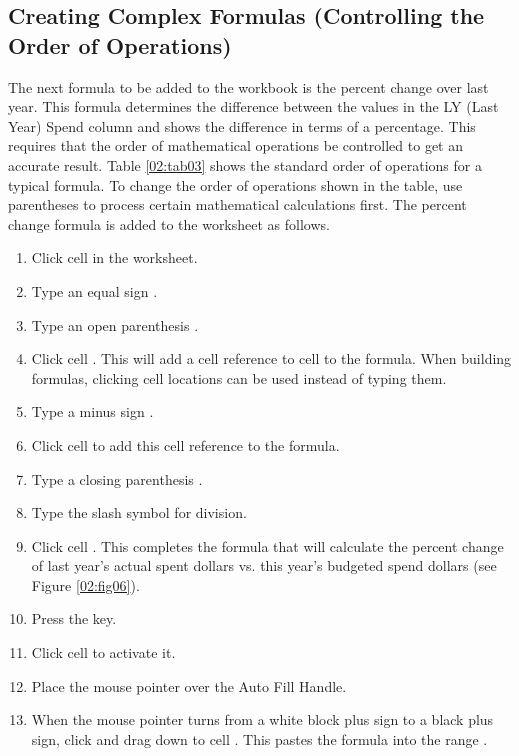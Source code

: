 \subsection{Creating Complex Formulas (Controlling the Order of Operations)}

The next formula to be added to the  workbook is the percent change over last year. This formula determines the difference between the values in the LY (Last Year) Spend column and shows the difference in terms of a percentage. This requires that the order of mathematical operations be controlled to get an accurate result. Table \ref{02:tab03} shows the standard order of operations for a typical formula. To change the order of operations shown in the table, use parentheses to process certain mathematical calculations first. The percent change formula is added to the worksheet as follows.

\begin{enumerate}
	\item Click cell  in the  worksheet.
	\item Type an equal sign \fmtTyping{=}.
	\item Type an open parenthesis \fmtTyping{(}.
	\item Click cell . This will add a cell reference to cell  to the formula. When building formulas, clicking cell locations can be used instead of typing them.
	\item Type a minus sign \fmtTyping{-}.
	\item Click cell  to add this cell reference to the formula.
	\item Type a closing parenthesis \fmtTyping{)}.
	\item Type the slash \fmtTyping{/} symbol for division.
	\item Click cell . This completes the formula that will calculate the percent change of last year's actual spent dollars vs. this year's budgeted spend dollars (see Figure \ref{02:fig06}).
	\item Press the  key.
	\item Click cell  to activate it.
	\item Place the mouse pointer over the Auto Fill Handle.
	\item When the mouse pointer turns from a white block plus sign to a black plus sign, click and drag down to cell . This pastes the formula into the range .
\end{enumerate}


